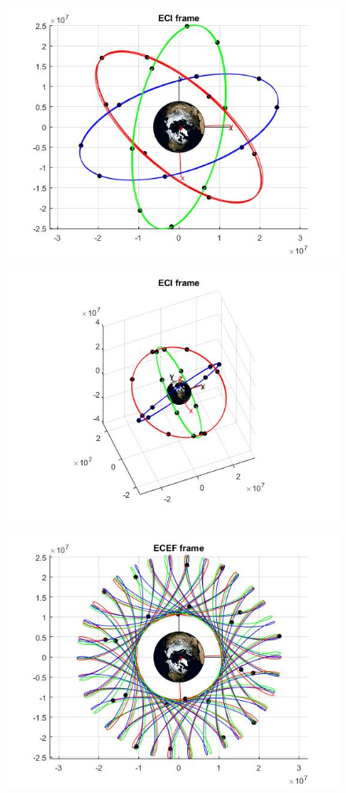 \documentclass[Space3_Assign2]{subfile}
\begin{document}
\begin{figure}
\centering
\includegraphics[width=0.8\linewidth]{Q2ECI}
\caption{}
\label{fig:Q2ECI}
\end{figure}
\begin{figure}
\centering
\includegraphics[width=0.7\linewidth]{Q2ECIside}
\caption{}
\label{fig:Q2ECIside}
\end{figure}
\begin{figure}
\centering
\includegraphics[width=0.7\linewidth]{Q2ECEF}
\caption{}
\label{fig:Q2ECEF}
\end{figure}
\end{document}
